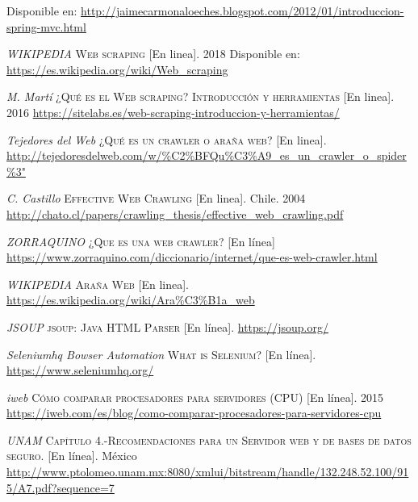 \begin{thebibliography}{}
	\linebreak
	Disponible en: 
	\url{http://jaimecarmonaloeches.blogspot.com/2012/01/introduccion-spring-mvc.html}
	
	\textit{WIKIPEDIA}
	\textsc{Web scraping} 
	[En linea]. 2018
	Disponible en:
	\url{https://es.wikipedia.org/wiki/Web_scraping}     
	
	\textit{M. Martí}
	\textsc{¿Qué es el Web scraping? Introducción y herramientas}
	[En linea]. 2016
	\url{https://sitelabs.es/web-scraping-introduccion-y-herramientas/}
	
	\textit{Tejedores del Web}
	\textsc{¿Qué es un crawler o araña web?}
	[En linea]. 
	\url{http://tejedoresdelweb.com/w/\%C2\%BFQu\%C3\%A9_es_un_crawler_o_spider\%3"}   
	
	\textit{C. Castillo}
	\textsc{Effective Web Crawling}
	[En linea]. Chile. 2004
	\url{http://chato.cl/papers/crawling_thesis/effective_web_crawling.pdf}
	
	\textit{ZORRAQUINO}
	\textsc{¿Que es una web crawler?}
	[En línea]
	\url{https://www.zorraquino.com/diccionario/internet/que-es-web-crawler.html}
	
	\textit{WIKIPEDIA}
	\textsc{Araña Web}
	[En linea].
	\newline
	\url{https://es.wikipedia.org/wiki/Ara\%C3\%B1a_web}
	
	\textit{JSOUP}
	\textsc{jsoup: Java HTML Parser}
	[En línea].
	\newline
	\url{https://jsoup.org/}
	
	\textit{Seleniumhq Bowser Automation}
	\textsc{What is Selenium?}
	[En línea].
	\newline
	\url{https://www.seleniumhq.org/}
	
	\textit{iweb}
	\textsc{Cómo comparar procesadores para servidores (CPU)}
	[En línea]. 2015
	\newline
	\url{https://iweb.com/es/blog/como-comparar-procesadores-para-servidores-cpu}
	
	\textit{UNAM}
	\textsc{Capítulo 4.-Recomendaciones para un Servidor web y de bases de datos seguro.}
	[En línea]. México
	\newline
	\url{http://www.ptolomeo.unam.mx:8080/xmlui/bitstream/handle/132.248.52.100/915/A7.pdf?sequence=7}
	

\end{thebibliography}
